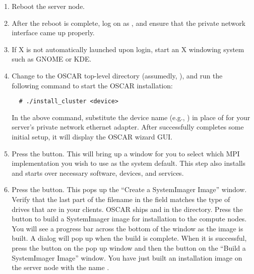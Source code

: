 \begin {enumerate}

\item Reboot the server node.  
  
\item After the reboot is complete, log on as , and ensure
  that the private network interface came up properly.
  
\item If X is not automatically launched upon  login, start
  an X windowing system such as GNOME or KDE.
  
\item Change to the OSCAR top-level directory (assumedly,
  ), and run the following
  command to start the OSCAR installation:

\begin{verbatim}
  # ./install_cluster <device>
\end{verbatim}
  
  In the above command, substitute the device name (e.g., )
  in place of  for your server's private network
  ethernet adapter.  After  successfully
  completes some initial setup, it will display the OSCAR wizard GUI.


\item Press the  button.
  This will bring up a window for you to select which MPI
  implementation you wish to use as the system default.  This step
  also installs and starts over necessary software, devices, and
  services.


\item Press the  button.  This pops
  up the ``Create a SystemImager Image'' window. Verify that the last
  part of the filename in the  field
  matches the type of drives that are in your clients. OSCAR ships
   and  in the
   directory.  Press the  button
  to build a SystemImager image for installation to the compute nodes.
  You will see a progress bar across the bottom of the window as the
  image is built.  A dialog will pop up when the build is complete.
  When it is successful, press the  button on the pop up
  window and then the  button on the ``Build a
  SystemImager Image'' window. You have just built an installation
  image on the server node with the name .


\end{enumerate}
